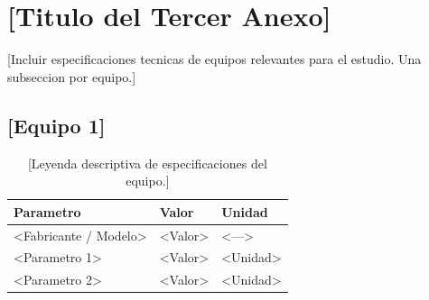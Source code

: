 \section{[Titulo del Tercer Anexo]}
\label{appendix:specs}

[Incluir especificaciones tecnicas de equipos relevantes para el estudio.
Una subseccion por equipo.]

\subsection{[Equipo 1]}

\begin{table}[htbp]
    \centering
    \caption{[Leyenda descriptiva de especificaciones del equipo.]}
    \label{tab:spec_equipo1}
    \begin{tabular}{@{}lll@{}}
        \toprule
        \textbf{Parametro} & \textbf{Valor} & \textbf{Unidad} \\
        \midrule
        <Fabricante / Modelo> & <Valor> & <---> \\
        <Parametro 1> & <Valor> & <Unidad> \\
        <Parametro 2> & <Valor> & <Unidad> \\
        \bottomrule
    \end{tabular}
\end{table}
